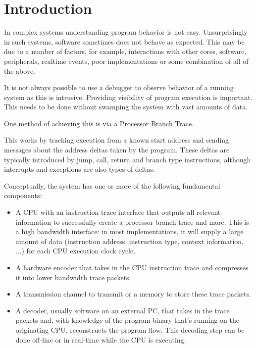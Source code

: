 \chapter{Introduction}
\label{sec:intro}

In complex systems understanding program behavior is not easy.
Unsurprisingly in such systems, software sometimes does not behave as
expected. This may be due to a number of factors, for example,
interactions with other cores, software, peripherals, realtime
events, poor implementations or some combination of all of the above.

It is not always possible to use a debugger to observe behavior of a
running system as this is intrusive.  Providing visibility of program
execution is important.  This needs to be done without swamping the
system with vast amounts of data.

One method of achieving this is via a Processor Branch Trace.

This works by tracking execution from a known start address and sending
messages about the address deltas taken by the program. These deltas are
typically introduced by jump, call, return and branch type instructions,
although interrupts and exceptions are also types of deltas.

Conceptually, the system has one or more of the following fundamental components:

\begin{itemize}
  \item
    A CPU with an instruction trace interface that outputs all relevant
    information to successfully create a processor branch trace and more.
    This is a high bandwidth interface: in most implementations, it will supply
    a large amount of data (instruction address, instruction type, context information, ...)
    for each CPU execution clock cycle.
  \item
    A hardware encoder that takes in the CPU instruction trace and compresses
    it into lower bandwidth trace packets.
  \item
    A transmission channel to transmit or a memory to store these trace packets.
  \item
    A decoder, usually software on an external PC, that takes in the trace
    packets and, with knowledge of the program binary that's running on the
    originating CPU, reconstructs the program flow. This decoding step can
    be done off-line or in real-time while the CPU is executing.
\end{itemize}

